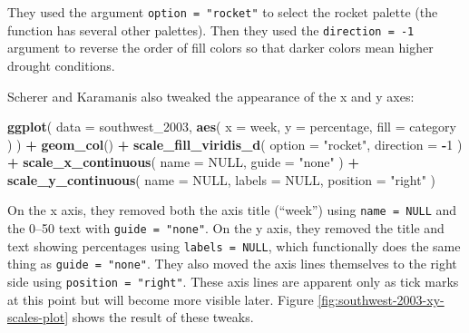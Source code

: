 \documentclass[
]{book}
\newenvironment{Shaded}{\begin{snugshade}}{\end{snugshade}}
\newcommand{\AttributeTok}[1]{\textcolor[rgb]{0.13,0.29,0.53}{#1}}
\newcommand{\ConstantTok}[1]{\textcolor[rgb]{0.56,0.35,0.01}{#1}}
\newcommand{\DecValTok}[1]{\textcolor[rgb]{0.00,0.00,0.81}{#1}}
\newcommand{\FunctionTok}[1]{\textcolor[rgb]{0.13,0.29,0.53}{\textbf{#1}}}
\newcommand{\NormalTok}[1]{#1}
\newcommand{\SpecialCharTok}[1]{\textcolor[rgb]{0.81,0.36,0.00}{\textbf{#1}}}
\newcommand{\StringTok}[1]{\textcolor[rgb]{0.31,0.60,0.02}{#1}}
\begin{document}
They used the argument \texttt{option\ =\ "rocket"} to select the rocket palette (the function has several other palettes). Then they used the \texttt{direction\ =\ -1} argument to reverse the order of fill colors so that darker colors mean higher drought conditions.

Scherer and Karamanis also tweaked the appearance of the x and y axes:

\begin{Shaded}
\begin{Highlighting}[]
\FunctionTok{ggplot}\NormalTok{(}
  \AttributeTok{data =}\NormalTok{ southwest\_2003,}
  \FunctionTok{aes}\NormalTok{(}
    \AttributeTok{x =}\NormalTok{ week,}
    \AttributeTok{y =}\NormalTok{ percentage,}
    \AttributeTok{fill =}\NormalTok{ category}
\NormalTok{  )}
\NormalTok{) }\SpecialCharTok{+}
  \FunctionTok{geom\_col}\NormalTok{() }\SpecialCharTok{+}
  \FunctionTok{scale\_fill\_viridis\_d}\NormalTok{(}
    \AttributeTok{option =} \StringTok{"rocket"}\NormalTok{,}
    \AttributeTok{direction =} \SpecialCharTok{{-}}\DecValTok{1}
\NormalTok{  ) }\SpecialCharTok{+}
  \FunctionTok{scale\_x\_continuous}\NormalTok{(}
    \AttributeTok{name =} \ConstantTok{NULL}\NormalTok{,}
    \AttributeTok{guide =} \StringTok{"none"}
\NormalTok{  ) }\SpecialCharTok{+}
  \FunctionTok{scale\_y\_continuous}\NormalTok{(}
    \AttributeTok{name =} \ConstantTok{NULL}\NormalTok{,}
    \AttributeTok{labels =} \ConstantTok{NULL}\NormalTok{,}
    \AttributeTok{position =} \StringTok{"right"}
\NormalTok{  )}
\end{Highlighting}
\end{Shaded}

On the x axis, they removed both the axis title (``week'') using \texttt{name\ =\ NULL} and the 0--50 text with \texttt{guide\ =\ "none"}. On the y axis, they removed the title and text showing percentages using \texttt{labels\ =\ NULL}, which functionally does the same thing as \texttt{guide\ =\ "none"}. They also moved the axis lines themselves to the right side using \texttt{position\ =\ "right"}. These axis lines are apparent only as tick marks at this point but will become more visible later. Figure \ref{fig:southwest-2003-xy-scales-plot} shows the result of these tweaks.
\end{document}
